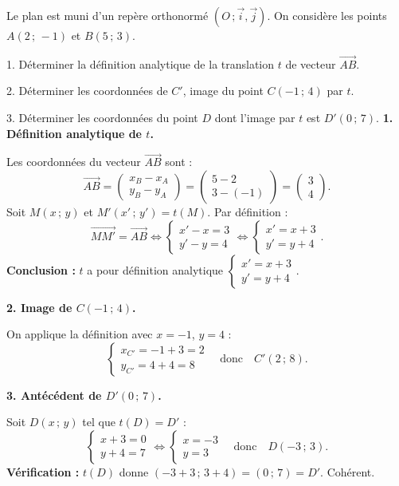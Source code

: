 \documentclass[11pt]{article}
\begin{document}
\begin{exoresolu}
Le plan est muni d'un repère orthonormé $(O\,;\vec{i},\vec{j})$. On considère les points $A(2\,;\,-1)$ et $B(5\,;\,3)$.

1. Déterminer la définition analytique de la translation $t$ de vecteur $\overrightarrow{AB}$.

2. Déterminer les coordonnées de $C'$, image du point $C(-1\,;\,4)$ par $t$.

3. Déterminer les coordonnées du point $D$ dont l'image par $t$ est $D'(0\,;\,7)$.
\tcblower
\textbf{1. Définition analytique de $t$.}

Les coordonnées du vecteur $\overrightarrow{AB}$ sont :
\[ \overrightarrow{AB} = \begin{pmatrix} x_B - x_A \\ y_B - y_A \end{pmatrix} = \begin{pmatrix} 5 - 2 \\ 3 - (-1) \end{pmatrix} = \begin{pmatrix} 3 \\ 4 \end{pmatrix}. \]
Soit $M(x\,;\,y)$ et $M'(x'\,;\,y') = t(M)$. Par définition :
\[ \overrightarrow{MM'} = \overrightarrow{AB} \iff \begin{cases} x' - x = 3 \\ y' - y = 4 \end{cases} \iff \begin{cases} x' = x + 3 \\ y' = y + 4 \end{cases}. \]
\textbf{Conclusion :} $t$ a pour définition analytique $\begin{cases} x' = x + 3 \\ y' = y + 4 \end{cases}$.

\textbf{2. Image de $C(-1\,;\,4)$.}

On applique la définition avec $x = -1$, $y = 4$ :
\[ \begin{cases} x_{C'} = -1 + 3 = 2 \\ y_{C'} = 4 + 4 = 8 \end{cases} \quad \text{donc} \quad C'(2\,;\,8). \]

\textbf{3. Antécédent de $D'(0\,;\,7)$.}

Soit $D(x\,;\,y)$ tel que $t(D)=D'$ :
\[ \begin{cases} x + 3 = 0 \\ y + 4 = 7 \end{cases} \iff \begin{cases} x = -3 \\ y = 3 \end{cases} \quad \text{donc} \quad D(-3\,;\,3). \]
\textbf{Vérification :} $t(D)$ donne $(-3+3\,;\,3+4) = (0\,;\,7) = D'$. Cohérent.
\end{exoresolu}
\end{document}
